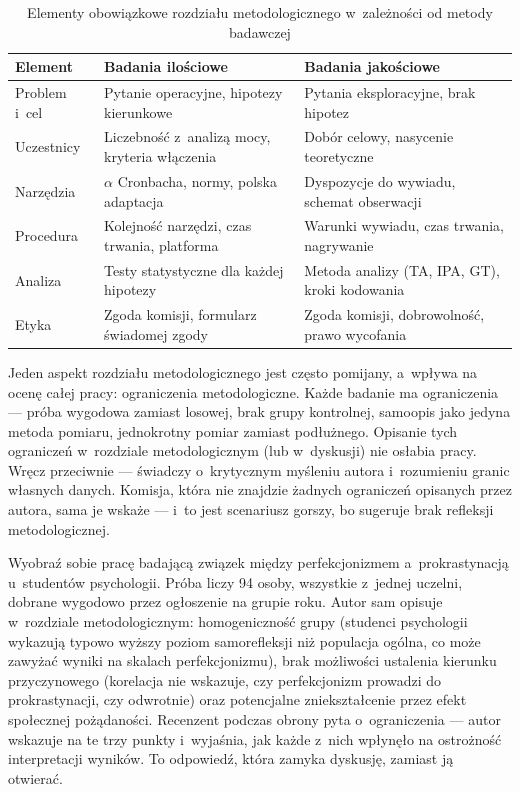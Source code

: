 \documentclass[12pt,a4paper,twoside,openany]{book}
\begin{document}
\begin{table}[ht]
\centering
\caption{Elementy obowiązkowe rozdziału metodologicznego w~zależności od metody badawczej}
\begin{tabularx}{\textwidth}{lXX}
\toprule
\rowcolor{tableheadbg} \textcolor{tableheadfg}{\textbf{Element}} & \textcolor{tableheadfg}{\textbf{Badania ilościowe}} & \textcolor{tableheadfg}{\textbf{Badania jakościowe}} \\
\midrule
Problem i~cel & Pytanie operacyjne, hipotezy kierunkowe & Pytania eksploracyjne, brak hipotez \\
Uczestnicy & Liczebność z~analizą mocy, kryteria włączenia & Dobór celowy, nasycenie teoretyczne \\
Narzędzia & $\alpha$ Cronbacha, normy, polska adaptacja & Dyspozycje do wywiadu, schemat obserwacji \\
Procedura & Kolejność narzędzi, czas trwania, platforma & Warunki wywiadu, czas trwania, nagrywanie \\
Analiza & Testy statystyczne dla każdej hipotezy & Metoda analizy (TA, IPA, GT), kroki kodowania \\
Etyka & Zgoda komisji, formularz świadomej zgody & Zgoda komisji, dobrowolność, prawo wycofania \\
\bottomrule
\end{tabularx}
\end{table}

Jeden aspekt rozdziału metodologicznego jest często pomijany, a~wpływa na ocenę całej pracy: ograniczenia metodologiczne. Każde badanie ma ograniczenia --- próba wygodowa zamiast losowej, brak grupy kontrolnej, samoopis jako jedyna metoda pomiaru, jednokrotny pomiar zamiast podłużnego. Opisanie tych ograniczeń w~rozdziale metodologicznym (lub w~dyskusji) nie osłabia pracy. Wręcz przeciwnie --- świadczy o~krytycznym myśleniu autora i~rozumieniu granic własnych danych. Komisja, która nie znajdzie żadnych ograniczeń opisanych przez autora, sama je wskaże --- i~to jest scenariusz gorszy, bo sugeruje brak refleksji metodologicznej.

\begin{examplebox}
Wyobraź sobie pracę badającą związek między perfekcjonizmem a~prokrastynacją u~studentów psychologii. Próba liczy 94 osoby, wszystkie z~jednej uczelni, dobrane wygodowo przez ogłoszenie na grupie roku. Autor sam opisuje w~rozdziale metodologicznym: homogeniczność grupy (studenci psychologii wykazują typowo wyższy poziom samorefleksji niż populacja ogólna, co może zawyżać wyniki na skalach perfekcjonizmu), brak możliwości ustalenia kierunku przyczynowego (korelacja nie wskazuje, czy perfekcjonizm prowadzi do prokrastynacji, czy odwrotnie) oraz potencjalne zniekształcenie przez efekt społecznej pożądaności. Recenzent podczas obrony pyta o~ograniczenia --- autor wskazuje na te trzy punkty i~wyjaśnia, jak każde z~nich wpłynęło na ostrożność interpretacji wyników. To odpowiedź, która zamyka dyskusję, zamiast ją otwierać.
\end{examplebox}
\end{document}
